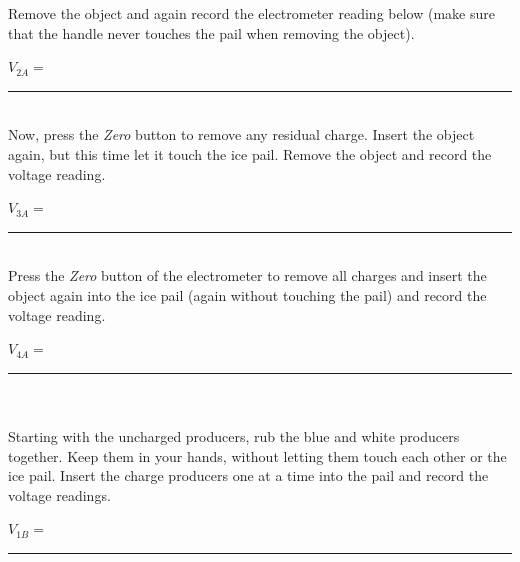 {{{{%

\noindent Remove the object and again record the electrometer
reading below (make sure that the handle never touches the pail
when removing the object).\\

\vspace{1cm}

\hspace{4cm}$V_{2A}=$\rule{5.0cm}{.1mm}\\


\noindent Now, press the {\it Zero} button to remove any residual
charge.  Insert the object again, but this time let it touch the
ice pail.  Remove the object and record the voltage
reading.\\

\vspace{1cm}

\hspace{4cm}$V_{3A}=$\rule{5.0cm}{.1mm}\\


\noindent Press the {\it Zero} button of the electrometer to
remove all charges and insert the object again into the ice pail
(again without touching the pail) and record
the voltage reading.\\

\vspace{1cm}

\hspace{4cm}$V_{4A}=$\rule{5.0cm}{.1mm}\\



\\
\noindent Starting with the uncharged producers, rub the blue and
white producers together.  Keep them in your hands, without
letting them touch each other or the ice pail. Insert the charge
producers one at a time into the pail and record the voltage readings.\\


\vspace{0.5cm}

\hspace{4cm}$V_{1B}=$\rule{5.0cm}{.1mm}

}}}}
